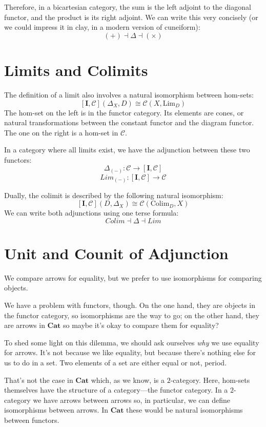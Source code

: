 \documentclass[DaoFP]{subfiles}
\begin{document}
Therefore, in a bicartesian category, the sum is the left adjoint to the diagonal functor, and the product is its right adjoint. We can write this very concisely (or we could impress it in clay, in a modern version of cuneiform):
\[ (+) \dashv \Delta \dashv (\times) \]


\section{Limits and Colimits}

The definition of a limit also involves a natural isomorphism between hom-sets:
\[ [\mathbf{I}, \mathcal{C}](\Delta_X, D)  \cong \mathcal{C}(X, \text{Lim}_D) \]
The hom-set on the left is in the functor category. Its elements are cones, or natural transformations between the constant functor and the diagram functor. The one on the right is a hom-set in $\mathcal{C}$. 

In a category where all limits exist, we have the adjunction between these two functors:
\[ \Delta_{(-)} \colon \mathcal{C} \to  [\mathbf{I}, \mathcal{C}] \]
\[ Lim_{(-)} \colon  [\mathbf{I}, \mathcal{C}] \to \mathcal{C} \]

Dually, the colimit is described by the following natural isomorphism:
\[ [\mathbf{I}, \mathcal{C}](D, \Delta_X)  \cong \mathcal{C}( \text{Colim}_D, X) \]
We can write both adjunctions using one terse formula:
\[ Colim \dashv \Delta \dashv Lim\]

\section{Unit and Counit of Adjunction}

We compare arrows for equality, but we prefer to use isomorphisms for comparing objects. 

We have a problem with functors, though. On the one hand, they are objects in the functor category, so isomorphisms are the way to go; on the other hand, they are arrows in $\mathbf{Cat}$ so maybe it's okay to compare them for equality?

To shed some light on this dilemma, we should ask ourselves \emph{why} we use equality for arrows. It's not because we like equality, but because there's nothing else for us to do in a set. Two elements of a set are either equal or not, period. 

That's not the case in  $\mathbf{Cat}$ which, as we know, is a $2$-category. Here, hom-sets themselves have the structure of a category---the functor category. In a $2$-category we have arrows between arrows so, in particular, we can define isomorphisms between arrows. In $\mathbf{Cat}$ these would be natural isomorphisms between functors.
\end{document}
